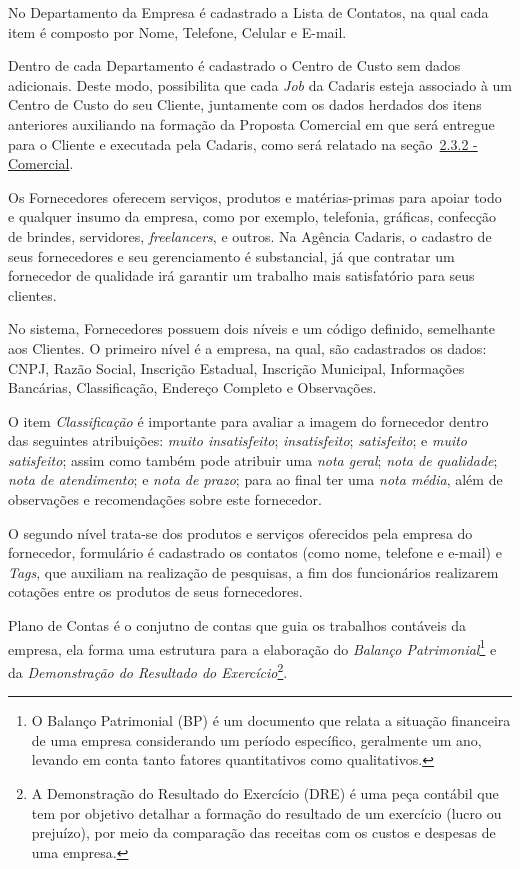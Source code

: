 \documentclass[
  12pt,				%
  openany,
  oneside,
  a4paper,			%
  english,			%
  brazil
]{article}
\numberwithin{figure}{section}
\numberwithin{table}{section}
\newcounter{subsubsubsection}[subsubsection]
\begin{document}
No Departamento da Empresa é cadastrado a Lista de Contatos, na qual cada item é composto por Nome, Telefone, Celular e E-mail.

Dentro de cada Departamento é cadastrado o Centro de Custo sem dados adicionais. Deste modo, possibilita que cada \textit{Job} da Cadaris esteja associado à um Centro de Custo do seu Cliente, juntamente com os dados herdados dos itens anteriores auxiliando na formação da Proposta Comercial em que será entregue para o Cliente e executada pela Cadaris, como será relatado na seção~\hyperref[sec:2.3.2]{2.3.2 - Comercial}.



Os Fornecedores oferecem serviços, produtos e matérias-primas para apoiar todo e qualquer insumo da empresa, como por exemplo, telefonia, gráficas, confecção de brindes, servidores, \textit{freelancers}, e outros. Na Agência Cadaris, o cadastro de seus fornecedores e seu gerenciamento é substancial, já que contratar um fornecedor de qualidade irá garantir um trabalho mais satisfatório para seus clientes.

No sistema, Fornecedores possuem dois níveis e um código definido, semelhante aos Clientes. O primeiro nível é a empresa, na qual, são cadastrados os dados: CNPJ, Razão Social, Inscrição Estadual, Inscrição Municipal, Informações Bancárias, Classificação, Endereço Completo e Observações.

O item \textit{Classificação} é importante para avaliar a imagem do fornecedor dentro das seguintes atribuições: \textit{muito insatisfeito}; \textit{insatisfeito}; \textit{satisfeito}; e \textit{muito satisfeito}; assim como também pode atribuir uma \textit{nota geral}; \textit{nota de qualidade}; \textit{nota de atendimento}; e \textit{nota de prazo}; para ao final ter uma \textit{nota média}, além de observações e recomendações sobre este fornecedor.

O segundo nível trata-se dos produtos e serviços oferecidos pela empresa do fornecedor, formulário é cadastrado os contatos (como nome, telefone e e-mail) e \textit{Tags}, que auxiliam na realização de pesquisas, a fim dos funcionários realizarem cotações entre os produtos de seus fornecedores.


Plano de Contas é o conjutno de contas que guia os trabalhos contáveis da empresa, ela forma uma estrutura para a elaboração do \textit{Balanço Patrimonial}\footnote{O Balanço Patrimonial (BP) é um documento que relata a situação financeira de uma empresa considerando um período específico, geralmente um ano, levando em conta tanto fatores quantitativos como qualitativos.} e da \textit{Demonstração do Resultado do Exercício}\footnote{A Demonstração do Resultado do Exercício (DRE) é uma peça contábil que tem por objetivo detalhar a formação do resultado de um exercício (lucro ou prejuízo), por meio da comparação das receitas com os custos e despesas de uma empresa.}.
\end{document}
